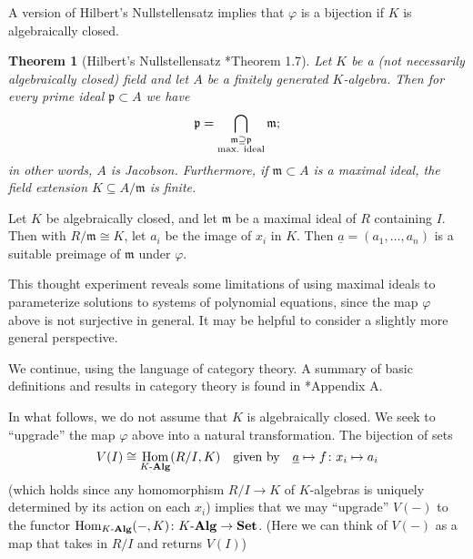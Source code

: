 \documentclass[11pt,leqno]{article}
\theoremstyle{plain}
\newtheorem{theorem}[lem]{Theorem}
\theoremstyle{definition}
\numberwithin{equation}{section}
\numberwithin{lem}{section}
\newcommand{\idx}[1]{#1\index{#1}} %
\DeclareMathOperator{\Hom}{Hom}
\newcommand{\catname}[1]{{\normalfont\mathbf{#1}}}
\newcommand{\Set}{\catname{Set}}
\newcommand{\Kalg}{K\text{-}\catname{Alg}}
\begin{document}
A version of Hilbert's Nullstellensatz implies that $\varphi$ is a bijection if $K$ is algebraically closed.
\begin{theorem}[Hilbert's \idx{Nullstellensatz} \cite{gw}*{Theorem 1.7}]\label{thm: nullstellensatz 1.7}
  Let $K$ be a \textup{(}not necessarily algebraically closed\textup{)} field and let $A$ be a finitely generated $K$-algebra. Then for every prime ideal $\mathfrak p\subset A$ we have
  \begin{equation}
    \mathfrak p = \bigcap_{\substack{\mathfrak m \supseteq \mathfrak p \\ \textup{max. ideal}}} \mathfrak m;
  \end{equation}
  in other words, $A$ is Jacobson.
  Furthermore, if $\mathfrak m \subset A$ is a maximal ideal, the field extension $K\subseteq A/\mathfrak m$ is finite.
\end{theorem}
Let $K$ be algebraically closed, and let $\mathfrak m$ be a maximal ideal of $R$ containing $I$. Then with $R/\mathfrak m\cong K$, let $a_i$ be the image of $x_i$ in $K$. Then $\underline a = (a_1,\dots,a_n)$ is a suitable preimage of $\mathfrak m$ under $\varphi$.

This thought experiment reveals some limitations of using maximal ideals to parameterize solutions to systems of polynomial equations, since the map $\varphi$ above is not surjective in general. It may be helpful to consider a slightly more general perspective.

We continue, using the language of category theory. A summary of basic definitions and results in category theory is found in \cite{gw}*{Appendix A}.

In what follows, we do not assume that $K$ is algebraically closed. We seek to ``upgrade'' the map $\varphi$ above into a natural transformation. The bijection of sets 
\begin{equation}
  V(I)\cong \Hom_{\Kalg}(R/I,K)\quad \text{given by}\quad  \underline a\mapsto f\colon x_i\mapsto a_i
\end{equation}
(which holds since any homomorphism $R/I\to K$ of $K$-algebras is uniquely determined by its action on each $x_i$) implies that we may ``upgrade'' $V(-)$ to the functor $\Hom_{\Kalg}(-,K)\colon \Kalg\to\Set$. (Here we can think of $V(-)$ as a map that takes in $R/I$ and returns $V(I)$)
\end{document}
